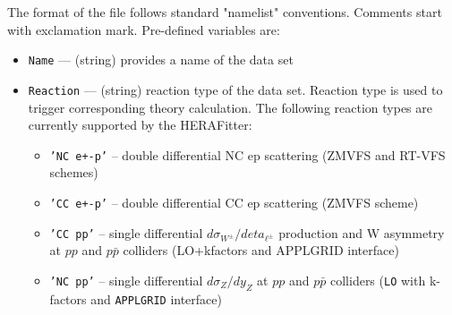 \documentclass[11pt,a4paper]{article}
\begin{document}
   The format of the file follows standard "namelist" conventions. Comments 
   start with exclamation mark.  Pre-defined variables are:
\begin{itemize}
     \item{\tt Name}        --- (string) provides a name of the data set
    \item{\tt  Reaction}    --- (string) reaction type of the data set. Reaction type is used 
                      to trigger corresponding theory calculation. The following 
                      reaction types  are currently supported by the HERAFitter:
                      \begin{itemize}
                        \item {\tt 'NC e+-p'}  -- double differential NC ep scattering
                                      (ZMVFS and RT-VFS schemes) 
                        \item {\tt 'CC e+-p'}  -- double differential CC ep scattering
                                      (ZMVFS scheme)
                        \item {\tt 'CC pp'}    -- single differential $d \sigma_{W^{\pm}}/d eta_{\ell^{\pm}}$
                                      production and W asymmetry at $pp$ and $p\bar{p}$ 
                                      colliders (LO+kfactors and APPLGRID interface)
                        \item {\tt 'NC pp'}    -- single differential $d \sigma_Z / d y_Z$ at $pp$ and
                                      $p\bar{p}$ colliders
                                      ({\tt LO} with k-factors and {\tt APPLGRID} interface)


\end{itemize}
\end{itemize}
\end{document}
